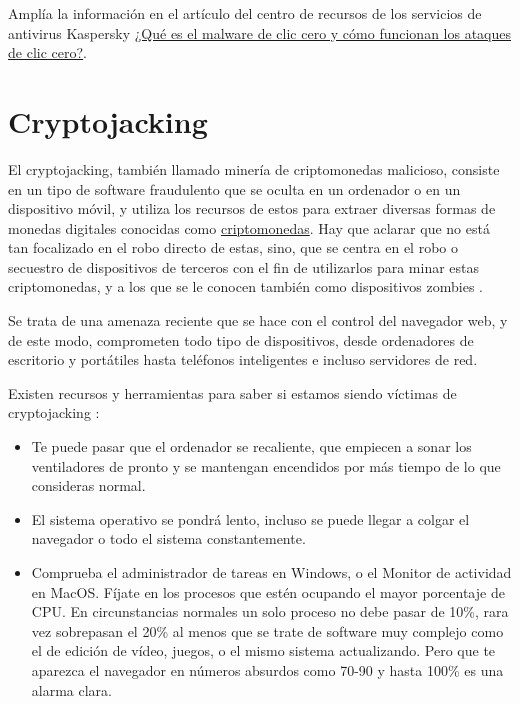 \documentclass[
  spanish,
  a4paper,
  openany]{book}
\begin{document}
Amplía la información en el artículo del centro de recursos de los servicios de antivirus Kaspersky \href{https://www.kaspersky.es/resource-center/definitions/what-is-zero-click-malware}{¿Qué es el malware de clic cero y cómo funcionan los ataques de clic cero?}.

\hypertarget{cryptojacking}{%
\section{Cryptojacking}\label{cryptojacking}}

El cryptojacking, también llamado minería de criptomonedas malicioso, consiste en un tipo de software fraudulento que se oculta en un ordenador o en un dispositivo móvil, y utiliza los recursos de estos para extraer diversas formas de monedas digitales conocidas como \href{https://es.wikipedia.org/wiki/Criptomoneda}{criptomonedas}. Hay que aclarar que no está tan focalizado en el robo directo de estas, sino, que se centra en el robo o secuestro de dispositivos de terceros con el fin de utilizarlos para minar estas criptomonedas, y a los que se le conocen también como dispositivos zombies \citep{cryptojacking}.

Se trata de una amenaza reciente que se hace con el control del navegador web, y de este modo, comprometen todo tipo de dispositivos, desde ordenadores de escritorio y portátiles hasta teléfonos inteligentes e incluso servidores de red.

Existen recursos y herramientas para saber si estamos siendo víctimas de cryptojacking \citep{GEN-guia-cryptojacking}:

\begin{itemize}
\item
  Te puede pasar que el ordenador se recaliente, que empiecen a sonar los ventiladores de pronto y se mantengan encendidos por más tiempo de lo que consideras normal.
\item
  El sistema operativo se pondrá lento, incluso se puede llegar a colgar el navegador o todo el sistema constantemente.
\item
  Comprueba el administrador de tareas en Windows, o el Monitor de actividad en MacOS. Fíjate en los procesos que estén ocupando el mayor porcentaje de CPU. En circunstancias normales un solo proceso no debe pasar de 10\%, rara vez sobrepasan el 20\% al menos que se trate de software muy complejo como el de edición de vídeo, juegos, o el mismo sistema actualizando. Pero que te aparezca el navegador en números absurdos como 70-90 y hasta 100\% es una alarma clara.
\end{itemize}
\end{document}
